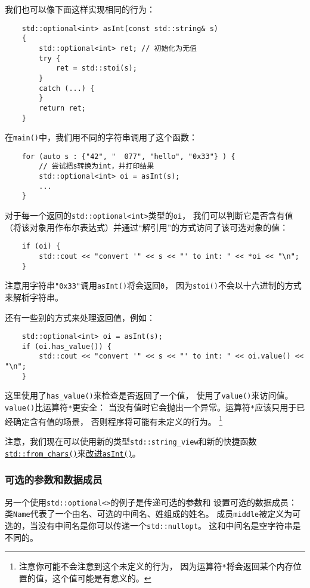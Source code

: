 我们也可以像下面这样实现相同的行为：
\begin{lstlisting}
    std::optional<int> asInt(const std::string& s)
    {
        std::optional<int> ret; // 初始化为无值
        try {
            ret = std::stoi(s);
        }
        catch (...) {
        }
        return ret;
    }
\end{lstlisting}
在\texttt{main()}中，我们用不同的字符串调用了这个函数：
\begin{lstlisting}
    for (auto s : {"42", "  077", "hello", "0x33"} ) {
        // 尝试把s转换为int，并打印结果
        std::optional<int> oi = asInt(s);
        ...
    }
\end{lstlisting}
对于每一个返回的\texttt{std::optional<int>}类型的\texttt{oi}，
我们可以判断它是否含有值（将该对象用作布尔表达式）并通过“解引用”的方式访问了该可选对象的值：
\begin{lstlisting}
    if (oi) {
        std::cout << "convert '" << s << "' to int: " << *oi << "\n";
    }
\end{lstlisting}
注意用字符串\texttt{"0x33"}调用\texttt{asInt()}将会返回\texttt{0}，
因为\texttt{stoi()}不会以十六进制的方式来解析字符串。

还有一些别的方式来处理返回值，例如：
\begin{lstlisting}
    std::optional<int> oi = asInt(s);
    if (oi.has_value()) {
        std::cout << "convert '" << s << "' to int: " << oi.value() << "\n";
    }
\end{lstlisting}
这里使用了\texttt{has\_value()}来检查是否返回了一个值，
使用了\texttt{value()}来访问值。\texttt{value()}比运算符\texttt{*}更安全：
当没有值时它会抛出一个异常。运算符\texttt{*}应该只用于已经确定含有值的场景，
否则程序将可能有未定义的行为。
\footnote{注意你可能不会注意到这个未定义的行为，
因为运算符\texttt{*}将会返回某个内存位置的值，这个值可能是有意义的。}

注意，我们现在可以使用新的类型\texttt{std::string\_view}和新的快捷函数\hyperref[ch31.2.1]
{\texttt{std::from\_chars()}}来\hyperref[改进asInt]{改进\texttt{asInt()}}。

\subsubsection{可选的参数和数据成员}
另一个使用\texttt{std::optional<>}的例子是传递可选的参数和
设置可选的数据成员：
类\texttt{Name}代表了一个由名、可选的中间名、姓组成的姓名。
成员\texttt{middle}被定义为可选的，当没有中间名是你可以传递一个\texttt{std::nullopt}。
这和中间名是空字符串是不同的。

